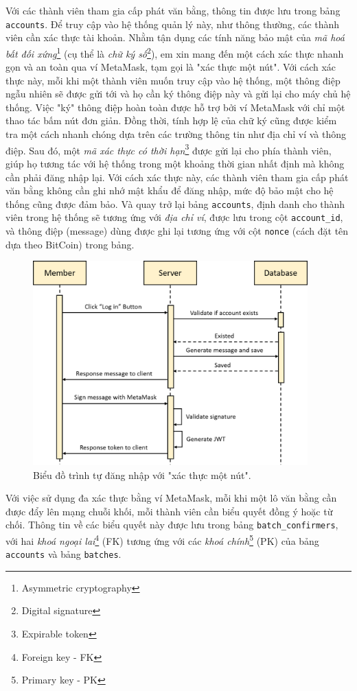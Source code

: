 Với các thành viên tham gia cấp phát văn bằng, thông tin được lưu trong bảng \texttt{accounts}. Để truy cập vào hệ thống quản lý này, như thông thường, các thành viên cần xác thực tài khoản. Nhằm tận dụng các tính năng bảo mật của \textit{mã hoá bất đối xứng}\footnote{Asymmetric cryptography} (cụ thể là \textit{chữ ký số}\footnote{Digital signature}), em xin mang đến một cách xác thực nhanh gọn và an toàn qua ví MetaMask, tạm gọi là "xác thực một nút". Với cách xác thực này, mỗi khi một thành viên muốn truy cập vào hệ thống, một thông điệp ngẫu nhiên sẽ được gửi tới và họ cần ký thông điệp này và gửi lại cho máy chủ hệ thống. Việc "ký" thông điệp hoàn toàn được hỗ trợ bởi ví MetaMask với chỉ một thao tác bấm nút đơn giản. Đồng thời, tính hợp lệ của chữ ký cũng được kiểm tra một cách nhanh chóng dựa trên các trường thông tin như địa chỉ ví và thông điệp. Sau đó, một \textit{mã xác thực có thời hạn}\footnote{Expirable token} được gửi lại cho phía thành viên, giúp họ tương tác với hệ thống trong một khoảng thời gian nhất định mà không cần phải đăng nhập lại. Với cách xác thực này, các thành viên tham gia cấp phát văn bằng không cần ghi nhớ mật khẩu để đăng nhập, mức độ bảo mật cho hệ thống cũng được đảm bảo. Và quay trở lại bảng \texttt{accounts}, định danh cho thành viên trong hệ thống sẽ tương ứng với \textit{địa chỉ ví}, được lưu trong cột \texttt{account\_id}, và thông điệp (message) dùng được ghi lại tương ứng với cột \texttt{nonce} (cách đặt tên dựa theo BitCoin) trong bảng.\\

\clearpage
\begin{figure}[ht]
    \centering
    \includegraphics[width=400px]{images/login-flow.png}
    \caption{Biểu đồ trình tự đăng nhập với "xác thực một nút".}
\end{figure}

Với việc sử dụng đa xác thực bằng ví MetaMask, mỗi khi một lô văn bằng cần được đẩy lên mạng chuỗi khối, mỗi thành viên cần biểu quyết đồng ý hoặc từ chối. Thông tin về các biểu quyết này được lưu trong bảng \texttt{batch\_confirmers}, với hai \textit{khoá ngoại lai}\footnote{Foreign key - FK} (FK) tương ứng với các \textit{khoá chính}\footnote{Primary key - PK} (PK) của bảng \texttt{accounts} và bảng \texttt{batches}.\\

